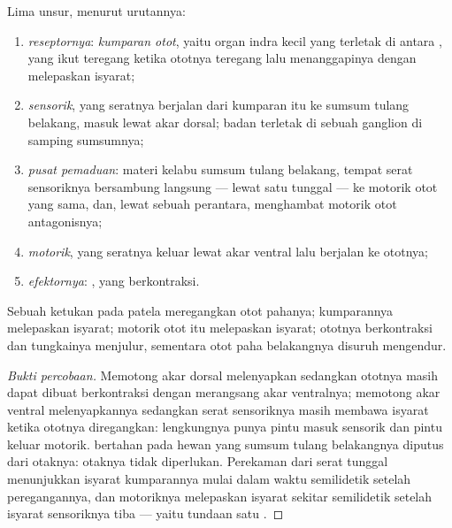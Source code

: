 \begin{proposition}\label{prop:g12:stretch-reflex:arc}
Lima unsur, menurut urutannya:
\begin{enumerate}
  \item \emph{reseptornya}: \emph{kumparan otot}, yaitu organ indra
        kecil yang terletak di antara , yang ikut teregang
        ketika ototnya teregang lalu menanggapinya dengan melepaskan
        isyarat;
  \item \emph{ sensorik}, yang seratnya berjalan dari kumparan
        itu ke sumsum tulang belakang, masuk lewat akar dorsal; badan
         terletak di sebuah ganglion di samping sumsumnya;
  \item \emph{pusat pemaduan}: materi kelabu sumsum tulang belakang,
        tempat serat sensoriknya bersambung langsung --- lewat satu
         tunggal --- ke  motorik otot yang sama, dan,
        lewat sebuah  perantara, menghambat  motorik otot
        antagonisnya;
  \item \emph{ motorik}, yang seratnya keluar lewat akar ventral
        lalu berjalan ke ototnya;
  \item \emph{efektornya}: , yang berkontraksi.
\end{enumerate}
Sebuah ketukan pada  patela meregangkan otot pahanya; kumparannya
melepaskan isyarat;  motorik otot itu melepaskan isyarat;
ototnya berkontraksi dan tungkainya menjulur, sementara otot paha
belakangnya disuruh mengendur.
\end{proposition}
\begin{proof}[Bukti percobaan]
Memotong akar dorsal melenyapkan  sedangkan ototnya masih
dapat dibuat berkontraksi dengan merangsang akar ventralnya; memotong
akar ventral melenyapkannya sedangkan serat sensoriknya masih membawa
isyarat ketika ototnya diregangkan: lengkungnya punya pintu masuk
sensorik dan pintu keluar motorik.  bertahan pada hewan yang
sumsum tulang belakangnya diputus dari otaknya: otaknya tidak
diperlukan. Perekaman dari serat tunggal menunjukkan isyarat
kumparannya mulai dalam waktu semilidetik setelah peregangannya, dan
 motoriknya melepaskan isyarat sekitar semilidetik setelah
isyarat sensoriknya tiba --- yaitu tundaan satu .
\end{proof}

